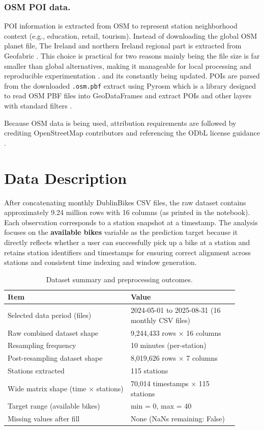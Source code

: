 \documentclass[11pt]{report}
\begin{document}
\subsubsection{OSM POI data.} POI information is extracted from OSM to represent station neighborhood context (e.g., education, retail, tourism).  Instead of downloading the global OSM planet file, The Ireland and northern Ireland regional part is extracted from Geofabric \cite{geofabrik_ireland}. This choice is practical for two reasons mainly being the file size is far smaller than global alternatives, making it manageable for local processing and reproducible experimentation \cite{geofabrik_ireland}. and its constantly being updated. POIs are parsed from the downloaded \texttt{.osm.pbf} extract using Pyrosm which is a library designed to read OSM PBF files into GeoDataFrames and extract POIs and other layers with standard filters \cite{pyrosm_docs}. 


Because OSM data is being used, attribution requirements are followed by crediting OpenStreetMap contributors and referencing the ODbL license guidance \cite{osm_copyright,osm_attribution}.

\section{Data Description}

After concatenating monthly DublinBikes CSV files, the raw dataset contains approximately 9.24 million rows with 16 columns (as printed in the notebook). Each observation corresponds to a station snapshot at a timestamp. The analysis focuses on the \textbf{available bikes} variable as the prediction target because it directly reflects whether a user can successfully pick up a bike at a station and retains station identifiers and timestamps for ensuring correct alignment across stations and consistent time indexing and window generation. 

\begin{table}[!h]
\centering
\caption{Dataset summary and preprocessing outcomes.}
\label{tab:data_summary}
\renewcommand{\arraystretch}{1.15}
\begin{tabular}{p{0.48\linewidth} p{0.42\linewidth}}
\hline
\textbf{Item} & \textbf{Value} \\
\hline
Selected data period (files) & 2024-05-01 to 2025-08-31 (16 monthly CSV files) \\
Raw combined dataset shape & 9,244,433 rows $\times$ 16 columns \\
Resampling frequency & 10 minutes (per-station) \\
Post-resampling dataset shape & 8,019,626 rows $\times$ 7 columns \\
Stations extracted & 115 stations \\
Wide matrix shape (time $\times$ stations) & 70,014 timestamps $\times$ 115 stations \\
Target range (available bikes) & min = 0, max = 40 \\
Missing values after fill & None (NaNs remaining: False) \\
\hline
\end{tabular}
\end{table}
\end{document}
